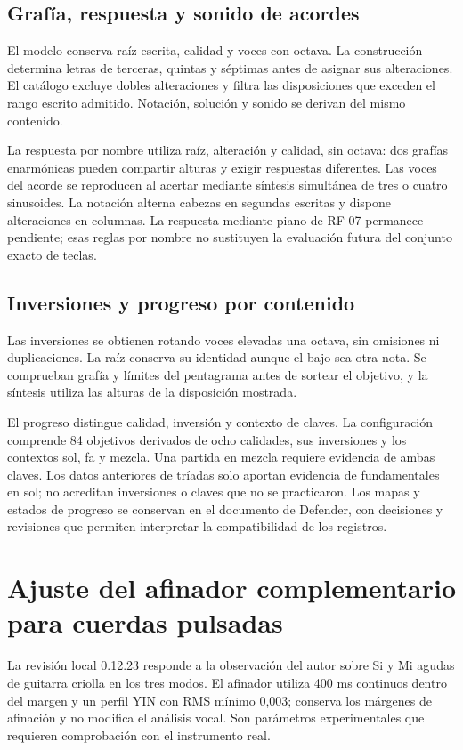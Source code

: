 \subsection{Grafía, respuesta y sonido de acordes}
\label{sec:implementacion-defender-d4}
El modelo conserva raíz escrita, calidad y voces con octava. La construcción
determina letras de terceras, quintas y séptimas antes de asignar sus alteraciones.
El catálogo excluye dobles alteraciones y filtra las disposiciones que exceden
el rango escrito admitido. Notación, solución y sonido se derivan del mismo
contenido.

La respuesta por nombre utiliza raíz, alteración y calidad, sin octava: dos
grafías enarmónicas pueden compartir alturas y exigir respuestas diferentes.
Las voces del acorde se reproducen al acertar mediante síntesis simultánea
de tres o cuatro sinusoides. La notación alterna cabezas en segundas escritas
y dispone alteraciones en columnas. La respuesta mediante piano de RF-07
permanece pendiente; esas reglas por nombre no sustituyen la evaluación futura
del conjunto exacto de teclas.

\subsection{Inversiones y progreso por contenido}
\label{sec:implementacion-defender-d5}
Las inversiones se obtienen rotando voces elevadas una octava, sin omisiones
ni duplicaciones. La raíz conserva su identidad aunque el bajo sea otra nota.
Se comprueban grafía y límites del pentagrama antes de sortear el objetivo,
y la síntesis utiliza las alturas de la disposición mostrada.

El progreso distingue calidad, inversión y contexto de claves. La configuración
comprende 84 objetivos derivados de ocho calidades, sus inversiones y los
contextos sol, fa y mezcla. Una partida en mezcla requiere evidencia de ambas
claves. Los datos anteriores de tríadas solo aportan evidencia de fundamentales
en sol; no acreditan inversiones o claves que no se practicaron. Los mapas y
estados de progreso se conservan en el documento de Defender, con decisiones
y revisiones que permiten interpretar la compatibilidad de los registros.

\section{Ajuste del afinador complementario para cuerdas pulsadas}
La revisión local 0.12.23 responde a la observación del autor sobre Si y Mi
agudas de guitarra criolla en los tres modos. El afinador utiliza 400 ms
continuos dentro del margen y un perfil YIN con RMS mínimo 0,003; conserva
los márgenes de afinación y no modifica el análisis vocal. Son parámetros
experimentales que requieren comprobación con el instrumento real.

